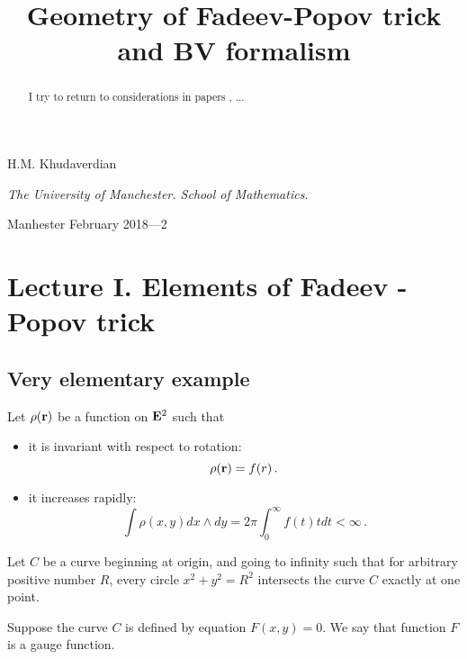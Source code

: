 \documentclass[12pt]{article}
\title{Geometry of Fadeev-Popov trick and BV formalism}
\date{}
\theoremstyle{theorem}
\numberwithin{equation}{section}
\begin{document}
\maketitle

 \centerline {H.M. Khudaverdian}

\centerline {\it The University of Manchester. School of Mathematics.}

\bigskip

  \centerline {Manhester  February 2018---2 }

\bigskip

\begin{abstract}
{
 I try to return to considerations in
papers \cite{KhNers}, \cite{Khcmp2}... 

  
}

\end{abstract}
\bigskip
   
\tableofcontents


\section {\bf Lecture I.  Elements of Fadeev -Popov trick}


\subsection {Very elementary example}


   Let $\rho({\bf r})$ be a function on ${\bf E}^2$ such that

\begin{itemize}

\item it is invariant with respect to rotation:
             $$
                \rho({\bf r})=f(r)\,.
                 $$

\item it increases rapidly:
                  $$
\int\rho(x,y)dx\wedge dy=2\pi\int_0^\infty f(t)tdt<\infty\,.
                  $$
\end{itemize}


   Let $C$ be a curve beginning at origin, and
going to infinity such that  for arbitrary positive number
  $R$, every circle $x^2+y^2=R^2$ intersects the curve $C$
exactly at one point.

    Suppose the curve $C$ is defined by equation $F(x,y)=0$.
We say that function $F$ is a gauge function.
\end{document}
